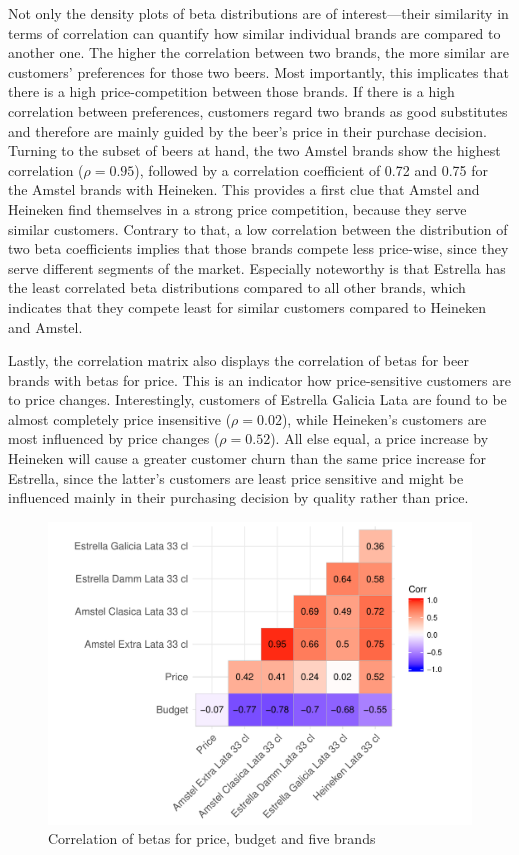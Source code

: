 \documentclass[12pt,a4paper]{article}
\begin{document}
Not only the density plots of beta distributions are of interest---their similarity in terms of correlation can quantify how similar individual brands are compared to another one.
The higher the correlation between two brands, the more similar are customers' preferences for those two beers.
Most importantly, this implicates that there is a high price-competition between those brands.
If there is a high correlation between preferences, customers regard two brands as good substitutes and therefore are mainly guided by the beer's price in their purchase decision.
Turning to the subset of beers at hand, the two Amstel brands show the highest correlation ($\rho=0.95$), followed by a correlation coefficient of 0.72 and 0.75 for the Amstel brands with Heineken.
This provides a first clue that Amstel and Heineken find themselves in a strong price competition, because they serve similar customers.
Contrary to that, a low correlation between the distribution of two beta coefficients implies that those brands compete less price-wise, since they serve different segments of the market.
Especially noteworthy is that Estrella has the least correlated beta distributions compared to all other brands, which indicates that they compete least for similar customers compared to Heineken and Amstel.

Lastly, the correlation matrix also displays the correlation of betas for beer brands with betas for price.
This is an indicator how price-sensitive customers are to price changes.
Interestingly, customers of Estrella Galicia Lata are found to be almost completely price insensitive ($\rho=0.02$), while Heineken's customers are most influenced by price changes ($\rho=0.52$).
All else equal, a price increase by Heineken will cause a greater customer churn than the same price increase for Estrella, since the latter's customers are least price sensitive and might be influenced mainly in their purchasing decision by quality rather than price.

\begin{figure}[ht]
	\centering
  \includegraphics[scale = 0.7]{figures/corrplot_betas_five.pdf}
	\caption{Correlation of betas for price, budget and five brands}
	\label{fig_corr_five}
\end{figure}
\end{document}
